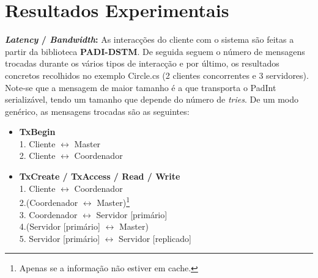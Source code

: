 \section{Resultados Experimentais}

\begin{description}

\item{\textbf{\textit{Latency} / \textit{Bandwidth}:}}
As interacções do cliente com o sistema são feitas a partir da biblioteca \textbf{PADI-DSTM}. De seguida seguem o número de mensagens trocadas durante os vários tipos de interacção e por último, os resultados concretos recolhidos no exemplo Circle.cs (2 clientes concorrentes e 3 servidores). Note-se que a mensagem de maior tamanho é a que transporta o PadInt serializável, tendo um tamanho que depende do número de \textit{tries}. De um modo genérico, as mensagens trocadas são as seguintes:

\begin{itemize}
\item \textbf{TxBegin}\\
1. Cliente $\longleftrightarrow$ Master\\
2. Cliente $\longleftrightarrow$ Coordenador

\item \textbf{TxCreate / TxAccess / Read / Write}\\
1. Cliente $\longleftrightarrow$ Coordenador\\
2.(Coordenador $\longleftrightarrow$ Master)\footnote{\label{note1}Apenas se a informação não estiver em cache.}\\
3. Coordenador $\longleftrightarrow$ Servidor [primário]\\
4.(Servidor [primário] $\longleftrightarrow$ Master)\footnotemark[2]\\
5. Servidor [primário] $\longleftrightarrow$ Servidor [replicado]


\end{itemize}
\end{description}

